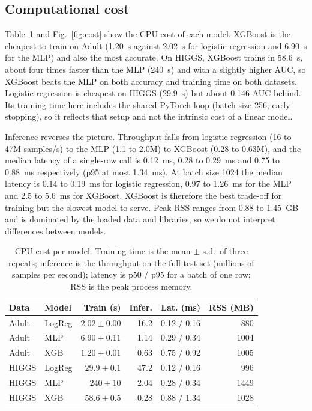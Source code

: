\documentclass[conference]{IEEEtran}
\begin{document}
\subsection{Computational cost}
Table~\ref{tab:cost} and Fig.~\ref{fig:cost} show the CPU cost of each model. XGBoost is the cheapest to train on Adult (1.20~s against 2.02~s for logistic regression and 6.90~s for the MLP) and also the most accurate. On HIGGS, XGBoost trains in 58.6~s, about four times faster than the MLP (240~s) and with a slightly higher AUC, so XGBoost beats the MLP on both accuracy and training time on both datasets. Logistic regression is cheapest on HIGGS (29.9~s) but about 0.146 AUC behind. Its training time here includes the shared PyTorch loop (batch size 256, early stopping), so it reflects that setup and not the intrinsic cost of a linear model.

Inference reverses the picture. Throughput falls from logistic regression (16 to 47M samples/s) to the MLP (1.1 to 2.0M) to XGBoost (0.28 to 0.63M), and the median latency of a single-row call is 0.12~ms, 0.28 to 0.29~ms and 0.75 to 0.88~ms respectively (p95 at most 1.34~ms). At batch size 1024 the median latency is 0.14 to 0.19~ms for logistic regression, 0.97 to 1.26~ms for the MLP and 2.5 to 5.6~ms for XGBoost. XGBoost is therefore the best trade-off for training but the slowest model to serve. Peak RSS ranges from 0.88 to 1.45~GB and is dominated by the loaded data and libraries, so we do not interpret differences between models.

\begin{table}[t]
\caption{CPU cost per model. Training time is the mean $\pm$ s.d.\ of three repeats; inference is the throughput on the full test set (millions of samples per second); latency is p50 / p95 for a batch of one row; RSS is the peak process memory.}
\label{tab:cost}
\centering
\footnotesize
\setlength{\tabcolsep}{3pt}
\begin{tabular}{llrrrr}
\toprule
Data & Model & Train (s) & Infer. & Lat. (ms) & RSS (MB) \\
\midrule
Adult & LogReg & $2.02 \pm 0.00$ & 16.2 & 0.12 / 0.16 & 880 \\
Adult & MLP    & $6.90 \pm 0.11$ & 1.14 & 0.29 / 0.34 & 1004 \\
Adult & XGB    & $1.20 \pm 0.01$ & 0.63 & 0.75 / 0.92 & 1005 \\
HIGGS & LogReg & $29.9 \pm 0.1$  & 47.2 & 0.12 / 0.16 & 996 \\
HIGGS & MLP    & $240 \pm 10$    & 2.04 & 0.28 / 0.34 & 1449 \\
HIGGS & XGB    & $58.6 \pm 0.5$  & 0.28 & 0.88 / 1.34 & 1028 \\
\bottomrule
\end{tabular}
\end{table}
\end{document}
